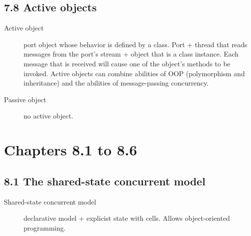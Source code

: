 \subsection{7.8 Active objects}
\begin{description}
  \item[Active object] port object whose behavior is defined by a class.
    Port + thread that reads messages from the port's stream + object that is a class instance.
    Each message that is received will cause one of the object's methods to be invoked.
    Active objects can combine abilities of OOP (polymorphism and inheritance) and the abilities of message-passing concurrency.
  \item[Passive object] no active object.
\end{description}

\section{Chapters 8.1 to 8.6}

\subsection{8.1 The shared-state concurrent model}
\begin{description}
  \item[Shared-state concurrent model] declarative model + explicist state with cells.
    Allows object-oriented programming.
\end{description}


